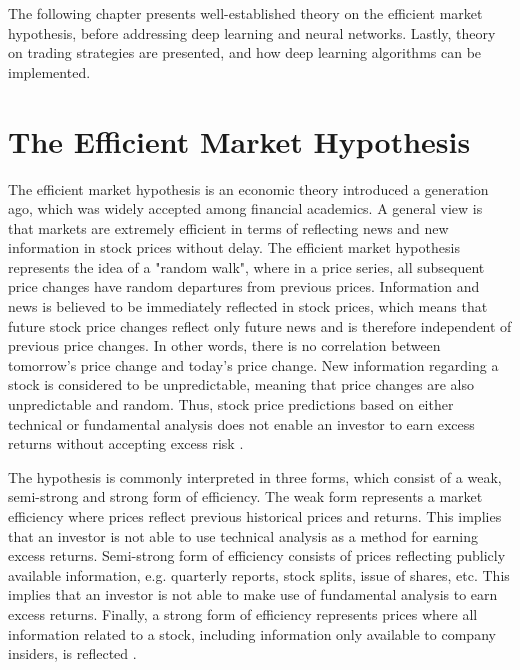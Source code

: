 The following chapter presents well-established theory on the efficient market hypothesis, before addressing deep learning and neural networks. Lastly, theory on trading strategies are presented, and how deep learning algorithms can be implemented.

\section{The Efficient Market Hypothesis}
The efficient market hypothesis is an economic theory introduced a generation ago, which was widely accepted among financial academics. A general view is that markets are extremely efficient in terms of reflecting news and new information in stock prices without delay. The efficient market hypothesis represents the idea of a "random walk", where in a price series, all subsequent price changes have random departures from previous prices. Information and news is believed to be immediately reflected in stock prices, which means that future stock price changes reflect only future news and is therefore independent of previous price changes. In other words, there is no correlation between tomorrow's price change and today's price change. New information regarding a stock is considered to be unpredictable, meaning that price changes are also unpredictable and random. Thus, stock price predictions based on either technical or fundamental analysis does not enable an investor to earn excess returns without accepting excess risk \cite{malkiel}. 

\indent \newline 
The hypothesis is commonly interpreted in three forms, which consist of a weak, semi-strong and strong form of efficiency. The weak form represents a market efficiency where prices reflect previous historical prices and returns. This implies that an investor is not able to use technical analysis as a method for earning excess returns. Semi-strong form of efficiency consists of prices reflecting publicly available information, e.g. quarterly reports, stock splits, issue of shares, etc. This implies that an investor is not able to make use of fundamental analysis to earn excess returns. Finally, a strong form of efficiency represents prices where all information related to a stock, including information only available to company insiders, is reflected \cite{fama}. 

